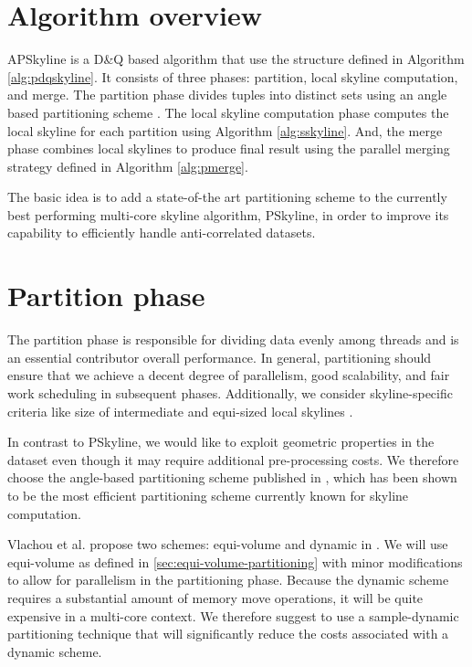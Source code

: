 \documentclass[12pt,a4paper,twoside]{report}
\begin{document}
\section{Algorithm overview}

APSkyline is a D\&Q based algorithm that use the structure defined in
Algorithm \ref{alg:pdqskyline}. It consists of three phases:
partition, local skyline computation, and merge. The partition phase
divides tuples into distinct sets using an angle based partitioning
scheme \cite{vlachou2008angle,kohler2011efficient}. The local skyline
computation phase computes the local skyline for each partition using
Algorithm \ref{alg:sskyline}. And, the merge phase combines local
skylines to produce final result using the parallel merging strategy
defined in Algorithm \ref{alg:pmerge}.

The basic idea is to add a state-of-the art partitioning scheme to
the currently best performing multi-core skyline algorithm,
PSkyline, in order to improve its capability to efficiently handle
anti-correlated datasets.

\section{Partition phase}

The partition phase is responsible for dividing data evenly among
threads and is an essential contributor overall performance. In
general, partitioning should ensure that we achieve a decent
degree of parallelism, good scalability, and fair work scheduling
in subsequent phases. Additionally, we consider skyline-specific
criteria like size of intermediate and equi-sized local skylines
\cite{vlachou2008angle}.

In contrast to PSkyline, we would like to exploit geometric
properties in the dataset even though it may require additional
pre-processing costs. We therefore choose the angle-based
partitioning scheme published in \cite{vlachou2008angle}, which
has been shown to be the most efficient partitioning scheme
currently known for skyline computation.

Vlachou et al. propose two schemes: equi-volume and dynamic in
\cite{vlachou2008angle}. We will use equi-volume as defined in
\ref{sec:equi-volume-partitioning} with minor modifications to
allow for parallelism in the partitioning phase. Because the
dynamic scheme requires a substantial amount of memory move
operations, it will be quite expensive in a multi-core context. We
therefore suggest to use a sample-dynamic partitioning technique
that will significantly reduce the costs associated with a dynamic
scheme.
\end{document}
